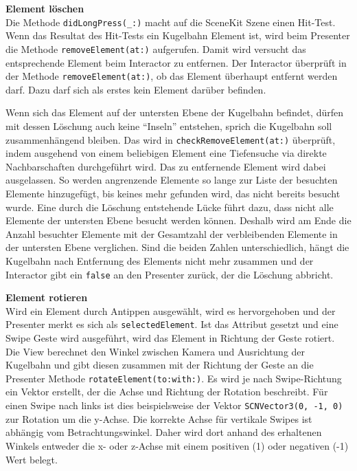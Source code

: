 
\textbf{Element löschen} \\
Die Methode \texttt{didLongPress(\_:)} macht auf die SceneKit Szene einen Hit-Test.
Wenn das Resultat des Hit-Tests ein Kugelbahn Element ist, wird beim Presenter die Methode \texttt{removeElement(at:)} aufgerufen.
Damit wird versucht das entsprechende Element beim Interactor zu entfernen.
Der Interactor überprüft in der Methode \texttt{removeElement(at:)}, ob das Element überhaupt entfernt werden darf.
Dazu darf sich als erstes kein Element darüber befinden.

Wenn sich das Element auf der untersten Ebene der Kugelbahn befindet, dürfen mit dessen Löschung auch keine "`Inseln"' entstehen, sprich die Kugelbahn soll zusammenhängend bleiben.
Das wird in \texttt{checkRemoveElement(at:)} überprüft, indem ausgehend von einem beliebigen Element eine Tiefensuche via direkte Nachbarschaften durchgeführt wird.
Das zu entfernende Element wird dabei ausgelassen.
So werden angrenzende Elemente so lange zur Liste der besuchten Elemente hinzugefügt, bis keines mehr gefunden wird, das nicht bereits besucht wurde.
Eine durch die Löschung entstehende Lücke führt dazu, dass nicht alle Elemente der untersten Ebene besucht werden können.
Deshalb wird am Ende die Anzahl besuchter Elemente mit der Gesamtzahl der verbleibenden Elemente in der untersten Ebene verglichen.
Sind die beiden Zahlen unterschiedlich, hängt die Kugelbahn nach Entfernung des Elements nicht mehr zusammen und der Interactor gibt ein \texttt{false} an den Presenter zurück, der die Löschung abbricht.

\textbf{Element rotieren} \\
Wird ein Element durch Antippen ausgewählt, wird es hervorgehoben und der Presenter merkt es sich als \texttt{selectedElement}.
Ist das Attribut gesetzt und eine Swipe Geste wird ausgeführt, wird das Element in Richtung der Geste rotiert.
Die View berechnet den Winkel zwischen Kamera und Ausrichtung der Kugelbahn und gibt diesen zusammen mit der Richtung der Geste an die Presenter Methode \texttt{rotateElement(to:with:)}.
Es wird je nach Swipe-Richtung ein Vektor erstellt, der die Achse und Richtung der Rotation beschreibt.
Für einen Swipe nach links ist dies beispielsweise der Vektor \texttt{SCNVector3(0, -1, 0)} zur Rotation um die y-Achse.
Die korrekte Achse für vertikale Swipes ist abhängig vom Betrachtungswinkel.
Daher wird dort anhand des erhaltenen Winkels entweder die x- oder z-Achse mit einem positiven (1) oder negativen (-1) Wert belegt.

